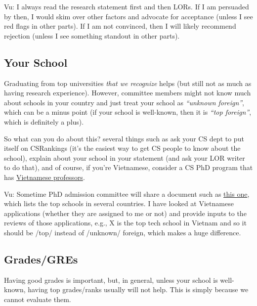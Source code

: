 \documentclass[10pt]{article}
\begin{document}
\begin{tcolorbox}[left=1pt,right=1pt,top=1pt,bottom=1pt]
Vu: I always read the research statement first and then LORs. If I am
persuaded by then, I would skim over other factors and advocate for
acceptance (unless I see red flags in other parts). If I am not
convinced, then I will likely recommend rejection (unless I see
something standout in other parts).
\end{tcolorbox}


\subsection{Your School}\label{sec:your-school}

Graduating from top universities \emph{that we recognize} helps (but still not as much as having research experience).
However, committee members might not know much about schools in your country and just treat your school as
\emph{``unknown foreign''}, which can be a minus point (if your school is well-known, then it is \emph{``top foreign''}, which is definitely a plus).

So what can you do about this? several things such as ask your CS dept to put itself on CSRankings (it's the easiest way to get CS people to know about the school), explain about your school in your statement (and ask your LOR writer to do that), and of course, if you're Vietnamese, consider a CS PhD program that has \href{https://github.com/dynaroars/dynaroars.github.io/wiki/Viet-CS-Profs-US}{Vietnamese professors}.

\begin{tcolorbox}[left=1pt,right=1pt,top=1pt,bottom=1pt]
Vu: Sometime PhD admission committee will share a document such as \href{https://github.com/dynaroars/dynaroars.github.io/wiki/Foreign-Top-Schools}{this one}, which lists the top schools in several countries. I have looked at Vietnamese applications (whether they are assigned to me or not) and provide inputs to the reviews of those applications, e.g., X is the top tech school in Vietnam and so it should be /top/ instead of /unknown/ foreign, which makes a huge difference.
\end{tcolorbox}

\subsection{Grades/GREs}\label{sec:grades}
Having good grades is important, but, in general, unless your school is well-known, having top grades/ranks
usually will not help. This is simply because we cannot evaluate them.
\end{document}

